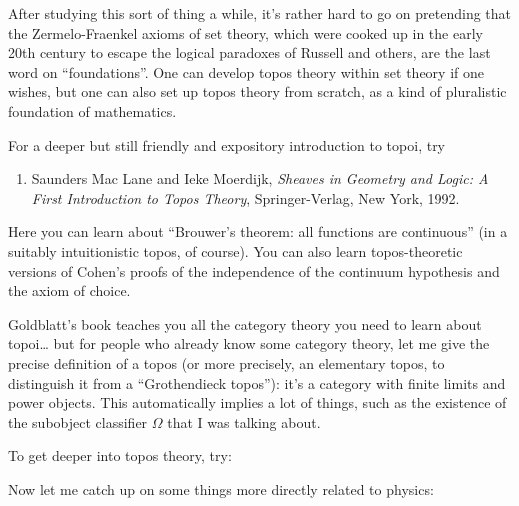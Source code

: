 \documentclass{article}
\def\tightlist{}
\renewcommand{\texttt}[1]{%
  \begingroup
  \ttfamily
  \begingroup\lccode`~=`/\lowercase{\endgroup\def~}{/\discretionary{}{}{}}%
  \begingroup\lccode`~=`[\lowercase{\endgroup\def~}{[\discretionary{}{}{}}%
  \begingroup\lccode`~=`.\lowercase{\endgroup\def~}{.\discretionary{}{}{}}%
  \catcode`/=\active\catcode`[=\active\catcode`.=\active
  \scantokens{#1\noexpand}%
  \endgroup
}
\begin{document}
After studying this sort of thing a while, it's rather hard to go on
pretending that the Zermelo-Fraenkel axioms of set theory, which were
cooked up in the early 20th century to escape the logical paradoxes of
Russell and others, are the last word on ``foundations''. One can
develop topos theory within set theory if one wishes, but one can also
set up topos theory from scratch, as a kind of pluralistic foundation of
mathematics.

For a deeper but still friendly and expository introduction to topoi,
try

\begin{enumerate}
\def\labelenumi{\arabic{enumi})}
\setcounter{enumi}{1}
\tightlist
\item
  Saunders Mac Lane and Ieke Moerdijk, \emph{Sheaves in Geometry and
  Logic: A First Introduction to Topos Theory}, Springer-Verlag, New
  York, 1992.
\end{enumerate}

Here you can learn about ``Brouwer's theorem: all functions are
continuous'' (in a suitably intuitionistic topos, of course). You can
also learn topos-theoretic versions of Cohen's proofs of the
independence of the continuum hypothesis and the axiom of choice.

Goldblatt's book teaches you all the category theory you need to learn
about topoi\ldots{} but for people who already know some category
theory, let me give the precise definition of a topos (or more
precisely, an elementary topos, to distinguish it from a ``Grothendieck
topos''): it's a category with finite limits and power objects. This
automatically implies a lot of things, such as the existence of the
subobject classifier \(\Omega\) that I was talking about.

To get deeper into topos theory, try:


Now let me catch up on some things more directly related to physics:

\end{document}
